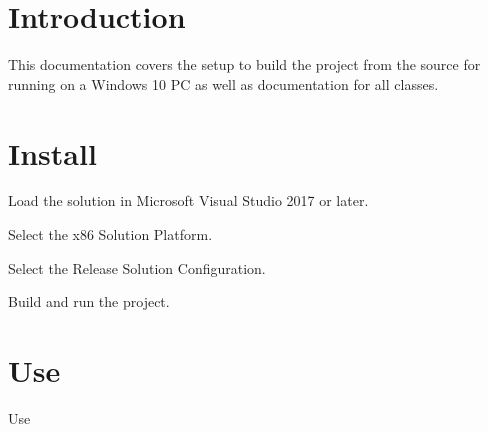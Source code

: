 \hypertarget{index_sec_intro}{}\section{Introduction}\label{index_sec_intro}
This documentation covers the setup to build the project from the source for running on a Windows 10 PC as well as documentation for all classes.\hypertarget{index_sec_running}{}\section{Install}\label{index_sec_running}

\begin{DoxyEnumerate}
\item Load the solution in Microsoft Visual Studio 2017 or later.
\item Select the x86 Solution Platform.
\item Select the Release Solution Configuration.
\item Build and run the project.
\end{DoxyEnumerate}\hypertarget{index_sec_use}{}\section{Use}\label{index_sec_use}
Use 